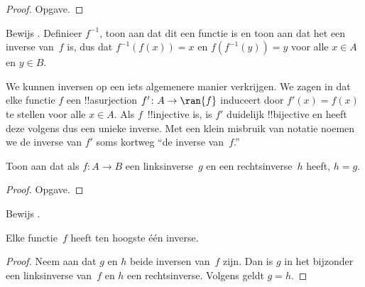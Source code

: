 \documentclass[openany]{memoir}
\begin{document}
\begin{proof}
Opgave.
\end{proof}

\begin{prob}
Bewijs . Definieer
$f^{-1}$, toon aan dat dit een functie is en toon aan dat het een
inverse van~$f$ is, dus dat $f^{-1}(f(x)) = x$ en
$f(f^{-1}(y)) = y$ voor alle $x \in A$ en $y \in B$.
\end{prob}

\begin{explain}
We kunnen inversen op een iets algemenere manier verkrijgen. We zagen
in  dat elke functie $f$ een !!a{surjection}
$f' \colon A \to \ran{f}$ induceert door $f'(x) = f(x)$ te stellen
voor alle $x \in A$. Als $f$~!!{injective} is, is $f'$ duidelijk
!!{bijective} en heeft deze volgens
 dus een unieke inverse. Met een klein
misbruik van notatie noemen we de inverse van $f'$ soms kortweg
``de inverse van~$f$.''
\end{explain}

\begin{prop}%
  Toon aan dat als $f\colon A \to B$ een linksinverse~$g$ en een
  rechtsinverse~$h$ heeft, $h = g$.
\end{prop}

\begin{proof}
  Opgave.
\end{proof}

\begin{prob}
  Bewijs .
\end{prob}

\begin{prop}
Elke functie~$f$ heeft ten hoogste één inverse.
\end{prop}

\begin{proof}
  Neem aan dat $g$ en $h$ beide inversen van~$f$ zijn. Dan is $g$ in
  het bijzonder een linksinverse van~$f$ en $h$ een rechtsinverse.
  Volgens  geldt $g = h$.
\end{proof}
\endgroup

\begingroup
\def\olfilename{OLP-0025}
\def\olfilepath{content/sets-functions-relations/functions/}
\hypertarget{unit-OLP-0025}{}
\end{document}
